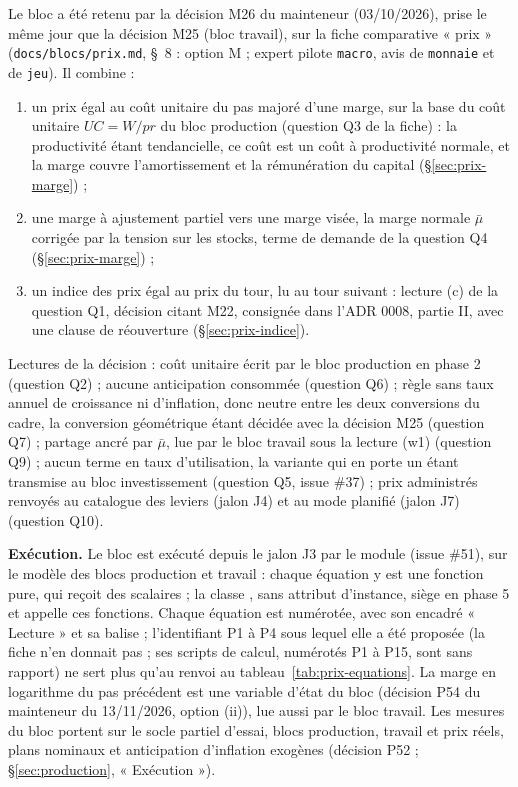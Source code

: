 \documentclass[11pt,a4paper]{article}
\newcommand{\code}[1]{\texttt{\detokenize{#1}}}
\begin{document}
Le bloc a été retenu par la décision M26 du mainteneur (03/10/2026), prise le même jour que la décision M25 (bloc travail), sur la fiche comparative « prix » (\nolinkurl{docs/blocs/prix.md}, \S~8 : option M ; expert pilote \texttt{macro}, avis de \texttt{monnaie} et de \texttt{jeu}). Il combine :
\begin{enumerate}[label=(\alph*)]
\item un prix égal au coût unitaire du pas majoré d'une marge, sur la base du coût unitaire $\mathit{UC} = W/\mathit{pr}$ du bloc production (question Q3 de la fiche) : la productivité étant tendancielle, ce coût est un coût à productivité normale, et la marge couvre l'amortissement et la rémunération du capital (\S\ref{sec:prix-marge}) ;
\item une marge à ajustement partiel vers une marge visée, la marge normale $\bar\mu$ corrigée par la tension sur les stocks, terme de demande de la question Q4 (\S\ref{sec:prix-marge}) ;
\item un indice des prix égal au prix du tour, lu au tour suivant : lecture (c) de la question Q1, décision citant M22, consignée dans l'ADR 0008, partie II, avec une clause de réouverture (\S\ref{sec:prix-indice}).
\end{enumerate}
Lectures de la décision : coût unitaire écrit par le bloc production en phase 2 (question Q2) ; aucune anticipation consommée (question Q6) ; règle sans taux annuel de croissance ni d'inflation, donc neutre entre les deux conversions du cadre, la conversion géométrique étant décidée avec la décision M25 (question Q7) ; partage ancré par $\bar\mu$, lue par le bloc travail sous la lecture (w1) (question Q9) ; aucun terme en taux d'utilisation, la variante qui en porte un étant transmise au bloc investissement (question Q5, issue \#37) ; prix administrés renvoyés au catalogue des leviers (jalon J4) et au mode planifié (jalon J7) (question Q10).

\textbf{Exécution.} Le bloc est exécuté depuis le jalon J3 par le module \code{nations.blocs.prix} (issue \#51), sur le modèle des blocs production et travail : chaque équation y est une fonction pure, qui reçoit des scalaires ; la classe \code{nations.blocs.prix.Prix}, sans attribut d'instance, siège en phase 5 et appelle ces fonctions. Chaque équation est numérotée, avec son encadré « Lecture » et sa balise ; l'identifiant P1 à P4 sous lequel elle a été proposée (la fiche n'en donnait pas ; ses scripts de calcul, numérotés P1 à P15, sont sans rapport) ne sert plus qu'au renvoi au tableau~\ref{tab:prix-equations}. La marge en logarithme du pas précédent est une variable d'état du bloc (décision P54 du mainteneur du 13/11/2026, option (ii)), lue aussi par le bloc travail. Les mesures du bloc portent sur le socle partiel d'essai, blocs production, travail et prix réels, plans nominaux et anticipation d'inflation exogènes (décision P52 ; \S\ref{sec:production}, « Exécution »).
\end{document}
